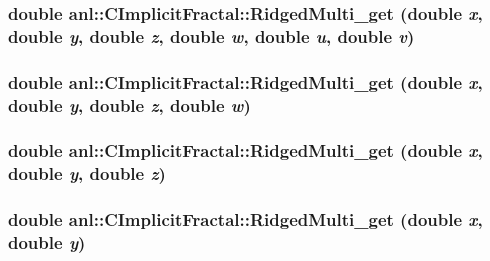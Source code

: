 \hypertarget{classanl_1_1CImplicitFractal_a91ded79224e96927f4948fe0d553751c}{
\subsubsection[{RidgedMulti\_\-get}]{\setlength{\rightskip}{0pt plus 5cm}double anl::CImplicitFractal::RidgedMulti\_\-get (double {\em x}, \/  double {\em y}, \/  double {\em z}, \/  double {\em w}, \/  double {\em u}, \/  double {\em v})}}
\label{classanl_1_1CImplicitFractal_a91ded79224e96927f4948fe0d553751c}
\hypertarget{classanl_1_1CImplicitFractal_a11514bff560a6d31726b015c95dbe525}{
\subsubsection[{RidgedMulti\_\-get}]{\setlength{\rightskip}{0pt plus 5cm}double anl::CImplicitFractal::RidgedMulti\_\-get (double {\em x}, \/  double {\em y}, \/  double {\em z}, \/  double {\em w})}}
\label{classanl_1_1CImplicitFractal_a11514bff560a6d31726b015c95dbe525}
\hypertarget{classanl_1_1CImplicitFractal_af29ca0d4a57093b9a66bc85fa4926730}{
\subsubsection[{RidgedMulti\_\-get}]{\setlength{\rightskip}{0pt plus 5cm}double anl::CImplicitFractal::RidgedMulti\_\-get (double {\em x}, \/  double {\em y}, \/  double {\em z})}}
\label{classanl_1_1CImplicitFractal_af29ca0d4a57093b9a66bc85fa4926730}
\hypertarget{classanl_1_1CImplicitFractal_ab27066fe7b659cbbb50947f7c668cb77}{
\subsubsection[{RidgedMulti\_\-get}]{\setlength{\rightskip}{0pt plus 5cm}double anl::CImplicitFractal::RidgedMulti\_\-get (double {\em x}, \/  double {\em y})}}

